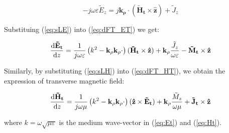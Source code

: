 \documentclass[11pt]{article}
\begin{document}
  \begin{equation}
    -j \omega \varepsilon \tilde{E}_z =
    j \mathbf{k_{\rho}} \cdot (\mathbf{\tilde{H}_t} \times \mathbf{\hat{z}}) + {\tilde{J}_z}
    \label{eq:sLE}
  \end{equation}

  Substituing (\ref{eq:sLE}) into (\ref{eq:dFT_ET}) we get:

  \begin{equation}
    \dv{\mathbf{\tilde{E}_t}}{z} =
    \frac{1}{j \omega \varepsilon} \left( k^2 - \mathbf{k_{\rho}}\mathbf{k_{\rho}} \cdot \right) (\mathbf{\tilde{H}_t} \times \mathbf{\hat{z}}) + \mathbf{k_{\rho}} \frac{\tilde{J}_z}{\omega \varepsilon} - \mathbf{\tilde{M}_t}
    \times \mathbf{\hat{z}}
    \label{eq:Et}
  \end{equation}

  Similarly, by substituting (\ref{eq:sLH}) into (\ref{eq:dFT_HT}), we obtain the expression of transverse magnetic field:

  \begin{equation}
    \dv{\mathbf{\tilde{H}_t}}{z} =
    \frac{1}{j \omega \mu} \left( k^2 - \mathbf{k_{\rho}}\mathbf{k_{\rho}} \cdot \right) (\mathbf{\hat{z}} \times \mathbf{\tilde{E}_t}) + \mathbf{k_{\rho}} \frac{\tilde{M}_z}{\omega \mu} + \mathbf{\tilde{J}_t}
    \times \mathbf{\hat{z}}
    \label{eq:Ht}
  \end{equation}

  where $k = \omega \sqrt{\mu \varepsilon}$ is the medium wave-vector in (\ref{eq:Et}) and (\ref{eq:Ht}).





  
  
\end{document}
